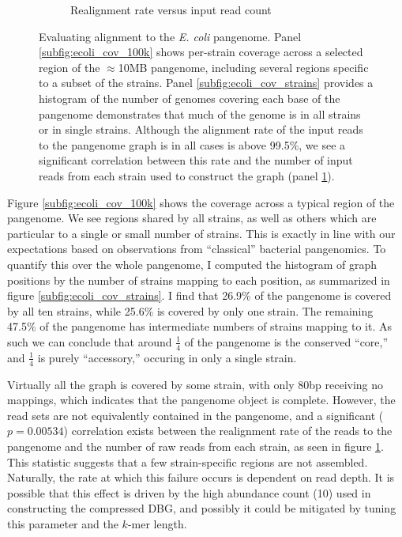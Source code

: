 \documentclass[a4paper,12pt,numbered,oneside]{Classes/PhDThesisPSnPDF}
\begin{document}
\begin{figure}[htbp!]
\begin{subfigure}[t]{0.49\textwidth}
    \caption{Realignment rate versus input read count}
    \label{subfig:ecoli_realignment_vs_input}
  \end{subfigure}
  \caption[Evaluating alignment to the \emph{E. coli} pangenome.]{
    Evaluating alignment to the \emph{E. coli} pangenome.
    Panel \ref{subfig:ecoli_cov_100k} shows per-strain coverage across a selected region of the $\approx$10MB pangenome, including several regions specific to a subset of the strains.
    Panel \ref{subfig:ecoli_cov_strains} provides a histogram of the number of genomes covering each base of the pangenome demonstrates that much of the genome is in all strains or in single strains.
    Although the alignment rate of the input reads to the pangenome graph is in all cases is above 99.5\%, we see a significant correlation between this rate and the number of input reads from each strain used to construct the graph (panel \ref{subfig:ecoli_realignment_vs_input}).
  }
  \label{fig:ecoli_pangenome_alignment}
\end{figure}

Figure \ref{subfig:ecoli_cov_100k} shows the coverage across a typical region of the pangenome.
We see regions shared by all strains, as well as others which are particular to a single or small number of strains.
This is exactly in line with our expectations based on observations from ``classical'' bacterial pangenomics.
To quantify this over the whole pangenome, I computed the histogram of graph positions by the number of strains mapping to each position, as summarized in figure \ref{subfig:ecoli_cov_strains}.
I find that 26.9\% of the pangenome is covered by all ten strains, while 25.6\% is covered by only one strain.
The remaining 47.5\% of the pangenome has intermediate numbers of strains mapping to it.
As such we can conclude that around $\frac{1}{4}$ of the pangenome is the conserved ``core,'' and $\frac{1}{4}$ is purely ``accessory,'' occuring in only a single strain.

Virtually all the graph is covered by some strain, with only 80bp receiving no mappings, which indicates that the pangenome object is complete.
However, the read sets are not equivalently contained in the pangenome, and a significant ($p=0.00534$) correlation exists between the realignment rate of the reads to the pangenome and the number of raw reads from each strain, as seen in figure \ref{subfig:ecoli_realignment_vs_input}.
This statistic suggests that a few strain-specific regions are not assembled.
Naturally, the rate at which this failure occurs is dependent on read depth.
It is possible that this effect is driven by the high abundance count (10) used in constructing the compressed DBG, and possibly it could be mitigated by tuning this parameter and the $k$-mer length.
\end{document}
